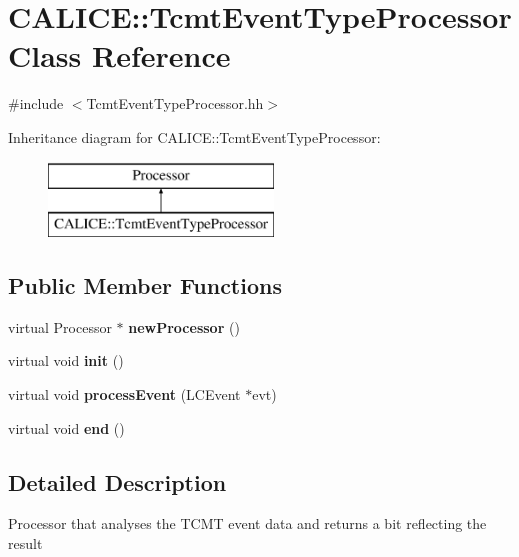 \section{C\-A\-L\-I\-C\-E\-:\-:Tcmt\-Event\-Type\-Processor Class Reference}
\label{classCALICE_1_1TcmtEventTypeProcessor}


{\ttfamily \#include $<$Tcmt\-Event\-Type\-Processor.\-hh$>$}

Inheritance diagram for C\-A\-L\-I\-C\-E\-:\-:Tcmt\-Event\-Type\-Processor\-:\begin{figure}[H]
\begin{center}
\leavevmode
\includegraphics[height=2.000000cm]{classCALICE_1_1TcmtEventTypeProcessor}
\end{center}
\end{figure}
\subsection*{Public Member Functions}
\begin{DoxyCompactItemize}
\item 
virtual Processor $\ast$ {\bfseries new\-Processor} ()\label{classCALICE_1_1TcmtEventTypeProcessor_a3bf9b0177f015c026cdaa89bdce6f597}

\item 
virtual void {\bfseries init} ()\label{classCALICE_1_1TcmtEventTypeProcessor_abc438f27b158fbaa33c64b9143396db1}

\item 
virtual void {\bfseries process\-Event} (L\-C\-Event $\ast$evt)\label{classCALICE_1_1TcmtEventTypeProcessor_a550cdda1709621ee6818c0039284f533}

\item 
virtual void {\bfseries end} ()\label{classCALICE_1_1TcmtEventTypeProcessor_abfc2f5366a03cc51aaab06eed36e28e9}

\end{DoxyCompactItemize}


\subsection{Detailed Description}
Processor that analyses the T\-C\-M\-T event data and returns a bit reflecting the result

